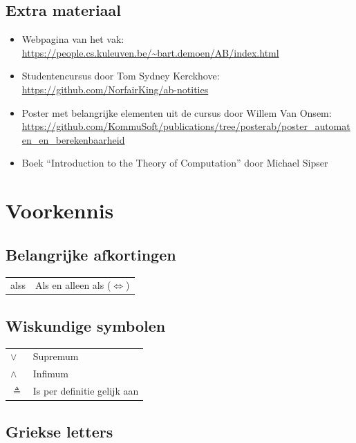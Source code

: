 \documentclass[a4paper]{article}
\begin{document}
\subsection{Extra materiaal}
\begin{itemize}
\item Webpagina van het vak:\\\url{https://people.cs.kuleuven.be/~bart.demoen/AB/index.html}
\item Studentencursus door Tom Sydney Kerckhove:\\\url{https://github.com/NorfairKing/ab-notities}
\item Poster met belangrijke elementen uit de cursus door Willem Van Onsem:\\\url{https://github.com/KommuSoft/publications/tree/posterab/poster_automaten_en_berekenbaarheid}
\item Boek ``Introduction to the Theory of Computation'' door Michael Sipser
\end{itemize}


\newpage

\section{Voorkennis}

\subsection{Belangrijke afkortingen}

\begin{tabular}{l|l}
	alss & Als en alleen als ($\Leftrightarrow$) \\
\end{tabular}

\subsection{Wiskundige symbolen}

\begin{tabular}{l|l}
	$\vee$ & Supremum \\
	$\wedge$ & Infimum \\
	$\triangleq$ & Is per definitie gelijk aan \\
\end{tabular}

\subsection{Griekse letters}
\end{document}
